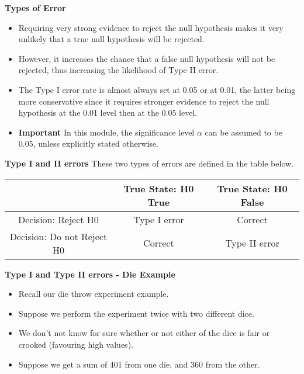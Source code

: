 \documentclass[a4]{beamer}
\begin{document}

\noindent \textbf{Types of Error}
\large
\begin{itemize}
\item
Requiring very strong evidence to reject the null hypothesis makes it very unlikely that a true null hypothesis will be rejected. \item However, it increases the chance that a false null hypothesis will not be rejected, thus increasing the likelihood of Type II error.
\item
The Type I error rate is almost always set at 0.05 or at 0.01, the latter being more conservative since it requires stronger evidence to reject the null hypothesis at the 0.01 level then at the 0.05 level.
\item \textbf{Important} In this module, the significance level $\alpha$ can be assumed to be 0.05, unless explicitly stated otherwise.
\end{itemize}


\noindent \textbf{Type I and II errors}
\large
These two types of errors are defined in the table below.
\small
\begin{center}
\begin{tabular}{|c|c|c|}
\hline
&True State: H0 True & True State: H0 False\\\hline
Decision: Reject H0 & Type I error& Correct\\\hline
Decision: Do not Reject H0 & Correct &Type II error\\ \hline
\end{tabular}
\end{center}





\noindent \textbf{Type I and Type II errors - Die Example}
\begin{itemize}
\item Recall our die throw experiment example.
\item Suppose we perform the experiment twice with two different dice.
\item We don't not know for sure whether or not either of the dice is fair or crooked (favouring high values).
\item Suppose we get a sum of 401 from one die, and 360 from the other.
\end{itemize}
\end{document}
